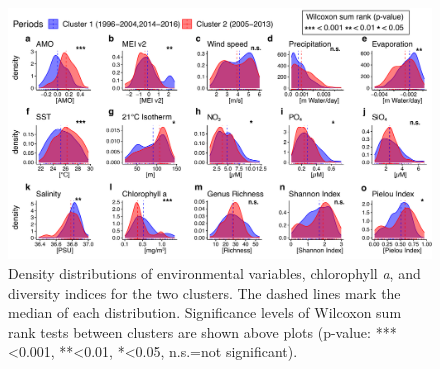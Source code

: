 \documentclass[draft]{agujournal2019}
\begin{document}
    \begin{figure}
    \noindent\includegraphics[width=\textwidth]{fig/Figure5_ClustCompPlot_v2.pdf}
    \caption{Density distributions of environmental variables, chlorophyll \textit{a}, and diversity indices for the two clusters. The dashed lines mark the median of each distribution. Significance levels of Wilcoxon sum rank tests between clusters are shown above plots  (p-value: ***\textless0.001, **\textless0.01, *\textless0.05, n.s.=not significant).}
    \label{fig:clustcomp}
    \end{figure}
    
\end{document}

